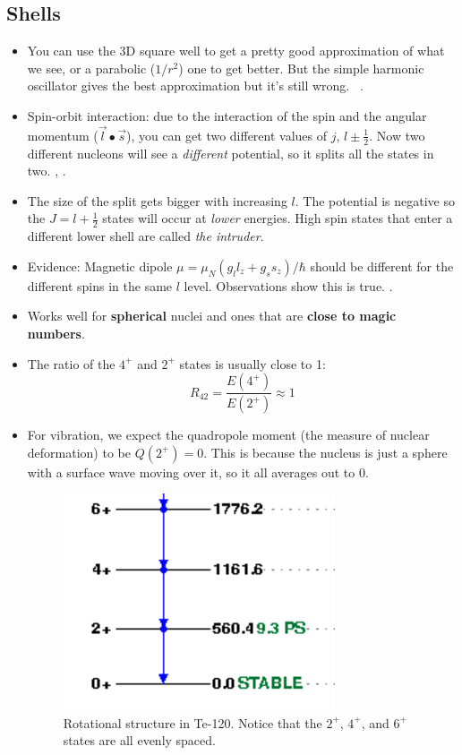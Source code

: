 \documentclass[letter]{article}
\begin{document}
\subsection{Shells}
\begin{itemize}
\item You can use the 3D square well to get a pretty good
  approximation of what we see, or a parabolic ($1/r^2$) one to get
  better. But the simple harmonic oscillator gives the best
  approximation but it's still wrong. ~\cite[Lec. 12]{lecture}.
\item Spin-orbit interaction: due to the interaction of the spin and
  the angular momentum ($\vec{l}\bullet\vec{s}$), you can get two
  different values of $j$, $l \pm \frac{1}{2}$. Now two different
  nucleons will see a \textit{different} potential, so it splits all
  the states in two. \cite[Lec. 13-16]{lecture},
  \cite[pp. 123-125]{krane}.
\item The size of the split gets bigger with increasing $l$. The
  potential is negative so the $J=l+\frac{1}{2}$ states will occur at
  \textit{lower} energies. High spin states that enter a different lower shell are called \textit{the
  intruder}. \cite[Lec. 13-16]{lecture}
\item Evidence: Magnetic dipole $\mu=\mu_N(g_ll_z + g_ss_z)/\hbar$
  should be different for the different spins in the same $l$
  level. Observations show this is true. \cite[Lec. 13-16]{lecture}.
\item Works well for \textbf{spherical} nuclei and ones that are
  \textbf{close to magic numbers}.
\item The ratio of the $4^+$ and $2^+$ states is usually close to 1:
  \begin{equation*}
    R_{42}=\frac{E(4^+)}{E(2^+)} \approx 1
  \end{equation*}
\item For vibration, we expect the quadropole moment (the measure of
  nuclear deformation) to be $Q(2^+)=0$. This is because the nucleus
  is just a sphere with a surface wave moving over it, so it all
  averages out to 0.~\cite[Lec 13-16]{lecture}
  \begin{figure}[hbt]
    \centering
    \includegraphics{images/te_120_rot}
    \caption{Rotational structure in Te-120. Notice that the $2^+$,
      $4^+$, and $6^+$ states are all evenly spaced.}
    \label{fig:te120}
  \end{figure}
\end{itemize}
\end{document}
